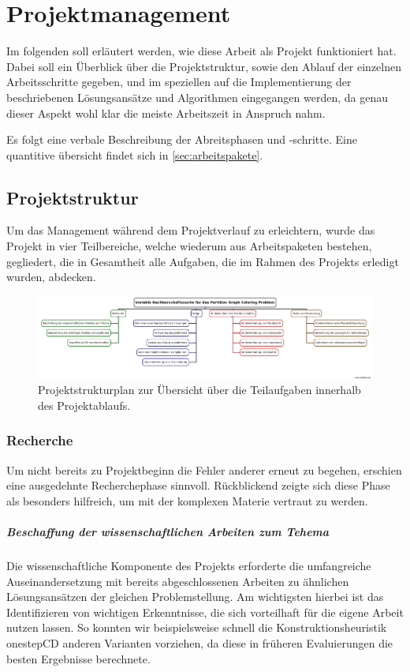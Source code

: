 \chapter{Projektmanagement}

Im folgenden soll erläutert werden, wie diese Arbeit als Projekt funktioniert hat. Dabei soll ein Überblick über die Projektstruktur, sowie den Ablauf der einzelnen Arbeitsschritte gegeben, und im speziellen auf die Implementierung der beschriebenen Lösungsansätze und Algorithmen eingegangen werden, da genau dieser Aspekt wohl klar die meiste Arbeitszeit in Anspruch nahm.

Es folgt eine verbale Beschreibung der Abreitsphasen und -schritte. Eine quantitive übersicht findet sich in \ref{sec:arbeitspakete}.

\section{Projektstruktur}

Um das Management während dem Projektverlauf zu erleichtern, wurde das Projekt in vier Teilbereiche, welche wiederum aus Arbeitspaketen bestehen, gegliedert, die in Gesamtheit alle Aufgaben, die im Rahmen des Projekts erledigt wurden, abdecken.

\begin{figure}
\centering
\includegraphics[angle=90, height=0.9\textheight]{img/psp.png}
\caption[Projektstrukturplan]{Projektstrukturplan zur Übersicht über die Teilaufgaben innerhalb des Projektablaufs.}
\label{fig:psp}
\end{figure}

\subsection{Recherche}

Um nicht bereits zu Projektbeginn die Fehler anderer erneut zu begehen, erschien eine ausgedehnte Recherchephase sinnvoll. Rückblickend zeigte sich diese Phase als besonders hilfreich, um mit der komplexen Materie vertraut zu werden.

\paragraph{Beschaffung der wissenschaftlichen Arbeiten zum Tehema}{Die wissenschaftliche Komponente des Projekts erforderte die umfangreiche Auseinandersetzung mit bereits abgeschlossenen Arbeiten zu ähnlichen Lösungsansätzen der gleichen Problemstellung. Am wichtigsten hierbei ist das Identifizieren von wichtigen Erkenntnisse, die sich vorteilhaft für die eigene Arbeit nutzen lassen. So konnten wir beispielsweise schnell die Konstruktionsheuristik onestepCD anderen Varianten vorziehen, da diese in früheren Evaluierungen die besten Ergebnisse berechnete.} %


